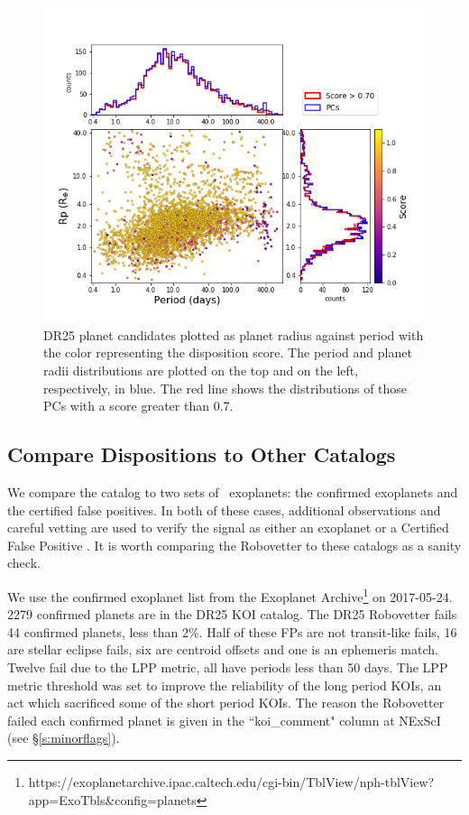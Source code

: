 \begin{figure}[ht]
    \centering
    \includegraphics[width=1.1\linewidth]{fig-radiusPeriodScore-hist.png}
    \caption{DR25 planet candidates plotted as planet radius against period with the color representing the disposition score. The period and planet radii distributions are plotted on the top and on the left, respectively, in blue. The red line shows the distributions of those PCs with a score greater than 0.7. }
    \label{f:catalogPlot}
\end{figure}

\subsection{Compare Dispositions to Other Catalogs}
We compare the catalog to two sets of \Kepler\ exoplanets: the confirmed exoplanets and the certified false positives.  In both of these cases, additional observations and careful vetting are used to verify the signal as either an exoplanet or a Certified False Positive \citep{Bryson2017c}. It is worth comparing the Robovetter to these catalogs as a sanity check.  

We use the confirmed exoplanet list from the Exoplanet Archive\footnote{https://exoplanetarchive.ipac.caltech.edu/cgi-bin/TblView/nph-tblView?app=ExoTbls\&config=planets} on 2017-05-24.  2279 confirmed planets are in the DR25 KOI catalog.  The DR25 Robovetter fails 44 confirmed planets, less than 2\%. Half of these FPs are not transit-like fails, 16 are stellar eclipse fails, six are centroid offsets and one is an ephemeris match. Twelve fail due to the LPP metric, all have periods less than 50 days.  The LPP metric threshold was set to improve the reliability of the long period KOIs, an act which sacrificed some of the short period KOIs.  The reason the Robovetter failed each confirmed planet is given in the ``koi\_comment" column at NExScI (see \S\ref{s:minorflags}). 

